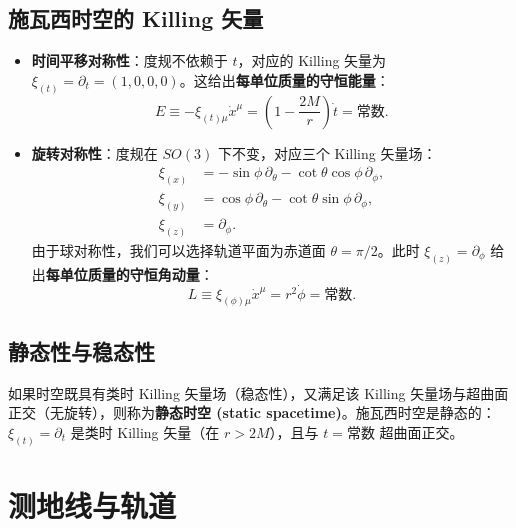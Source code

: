 \subsection{施瓦西时空的 Killing 矢量}

\begin{itemize}
    \item \textbf{时间平移对称性}：度规不依赖于 $t$，对应的 Killing 矢量为 $\xi_{(t)} = \partial_t = (1,0,0,0)$。这给出\textbf{每单位质量的守恒能量}：
    \begin{equation}
        E \equiv -\xi_{(t)\mu} \dot x^\mu = \left(1 - \frac{2M}{r}\right) \dot t = \text{常数}.
        \label{eq:E_conserved}
    \end{equation}
    
    \item \textbf{旋转对称性}：度规在 $SO(3)$ 下不变，对应三个 Killing 矢量场：
    \begin{align}
        \xi_{(x)} &= -\sin\phi\,\partial_\theta - \cot\theta\cos\phi\,\partial_\phi, \\
        \xi_{(y)} &= \cos\phi\,\partial_\theta - \cot\theta\sin\phi\,\partial_\phi, \\
        \xi_{(z)} &= \partial_\phi.
    \end{align}
    由于球对称性，我们可以选择轨道平面为赤道面 $\theta = \pi/2$。此时 $\xi_{(z)} = \partial_\phi$ 给出\textbf{每单位质量的守恒角动量}：
    \begin{equation}
        L \equiv \xi_{(\phi)\mu} \dot x^\mu = r^2 \dot\phi = \text{常数}.
        \label{eq:L_conserved}
    \end{equation}
\end{itemize}

\subsection{静态性与稳态性}

\begin{definition}[静态时空]
如果时空既具有类时 Killing 矢量场（稳态性），又满足该 Killing 矢量场与超曲面正交（无旋转），则称为\textbf{静态时空 (static spacetime)}。施瓦西时空是静态的：$\xi_{(t)} = \partial_t$ 是类时 Killing 矢量（在 $r>2M$），且与 $t=\text{常数}$ 超曲面正交。
\end{definition}

\section{测地线与轨道}
\label{sec:orbits}

